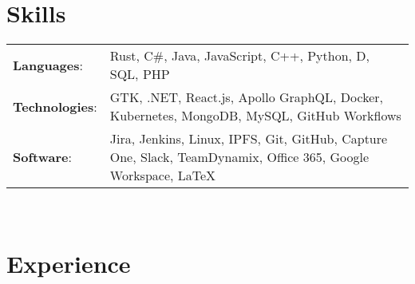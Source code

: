 \documentclass[letterpaper,8pt]{article} %
\begin{document}

\section{Skills}

\footnotesize{\begin{tabular}{ll}
\textbf{Languages}: & Rust, C\#, Java, JavaScript, C++, Python, D, SQL, PHP\\
\textbf{Technologies}: & GTK, .NET, React.js, Apollo GraphQL, Docker, Kubernetes, MongoDB, MySQL, GitHub Workflows\\
\textbf{Software}: & Jira, Jenkins, Linux, IPFS, Git, GitHub, Capture One, Slack, TeamDynamix, Office 365, Google Workspace, \LaTeX\\
\end{tabular}}\\


\section{Experience}
\end{document}
